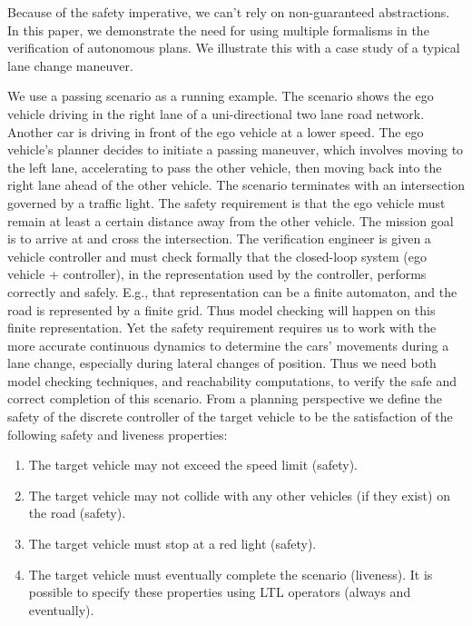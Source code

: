 	
Because of the safety imperative, we can't rely on non-guaranteed abstractions.  
	In this paper, we demonstrate the need for using multiple formalisms in the verification of autonomous plans. 
	We illustrate this with a case study of a typical lane change maneuver.


\begin{exmp}
	We use a passing scenario as a running example.
	The scenario shows the ego vehicle driving in the right lane of a uni-directional two lane road network. 
	Another car is driving in front of the ego vehicle at a lower speed.
	The ego vehicle's planner decides to initiate a passing maneuver, which involves moving to the left lane, accelerating to pass the other vehicle, then moving back into the right lane ahead of the other vehicle.
	The scenario terminates with an intersection governed by a traffic light. 
	The safety requirement is that the ego vehicle must remain at least a certain distance away from the other vehicle.
	The mission goal is to arrive at and cross the intersection.
	The verification engineer is given a vehicle controller and must check formally that the closed-loop system (ego vehicle + controller), in the representation used by the controller, performs correctly and safely.
	E.g., that representation can be a finite automaton, and the road is represented by a finite grid.
	Thus model checking will happen on this finite representation.
	Yet the safety requirement requires us to work with the more accurate continuous dynamics to determine the cars' movements during a lane change, especially during lateral changes of position. 
	Thus we need both model checking techniques, and reachability computations, to verify the safe and correct completion of this scenario.
	From a planning perspective we define the safety of the discrete controller of the target vehicle to be the satisfaction of the following safety and liveness properties:
	\begin{enumerate}
		\item The target vehicle may not exceed the speed limit (safety).
		\item The target vehicle may not collide with any other vehicles (if they exist) on the road (safety).
		\item The target vehicle must stop at a red light (safety).
		\item The target vehicle must eventually complete the scenario (liveness).
		It is possible to specify these properties using LTL operators (always and eventually).
	\end{enumerate}
\end{exmp}



